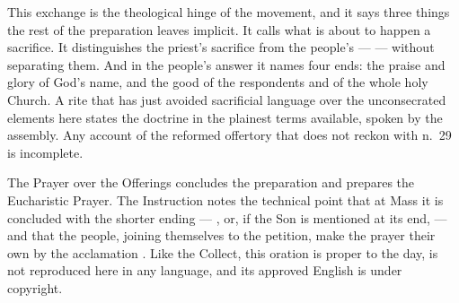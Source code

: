 This exchange is the theological hinge of the movement, and it says three things the rest of
the preparation leaves implicit. It calls what is about to happen a sacrifice. It distinguishes
the priest's sacrifice from the people's ---  --- without separating
them. And in the people's answer it names four ends: the praise and glory of God's name, and
the good of the respondents and of the whole holy Church. A rite that has just avoided
sacrificial language over the unconsecrated elements here states the doctrine in the plainest
terms available, spoken by the assembly. Any account of the reformed offertory that does not
reckon with n.\ 29 is incomplete.

The Prayer over the Offerings concludes the preparation and prepares the Eucharistic Prayer.
The Instruction notes the technical point that at Mass it is concluded with the shorter ending
--- , or, if the Son is mentioned at its end,  --- and that the people, joining themselves to the
petition, make the prayer their own by the acclamation .
Like the Collect, this oration is proper to the day, is not reproduced here in any language,
and its approved English is under copyright.
